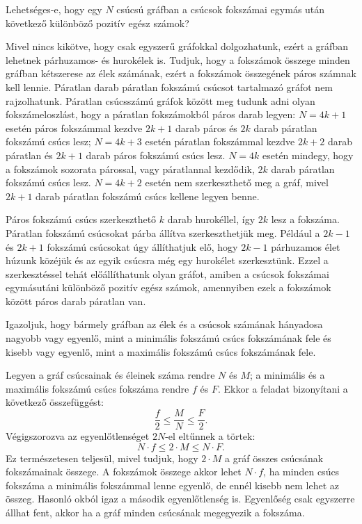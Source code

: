 \begin{problem}
	Lehetséges-e, hogy egy $N$ csúcsú gráfban a csúcsok fokszámai egymás után következő különböző pozitív egész számok?
\end{problem}
\begin{solution}
	Mivel nincs kikötve, hogy csak egyszerű gráfokkal dolgozhatunk, ezért a gráfban lehetnek párhuzamos- és hurokélek is.
	Tudjuk, hogy a fokszámok összege minden gráfban kétszerese az élek számának, ezért a fokszámok összegének páros számnak kell lennie.
	Páratlan darab páratlan fokszámú csúcsot tartalmazó gráfot nem rajzolhatunk.
	Páratlan csúcsszámú gráfok között meg tudunk adni olyan fokszámeloszlást, hogy a páratlan fokszámokból páros darab legyen:
	$N=4k+1$ esetén páros fokszámmal kezdve $2k+1$ darab páros és $2k$ darab páratlan fokszámú csúcs lesz;
	$N=4k+3$ esetén páratlan fokszámmal kezdve $2k+2$ darab páratlan és $2k+1$ darab páros fokszámú csúcs lesz.
	$N=4k$ esetén mindegy, hogy a fokszámok sozorata párossal, vagy páratlannal kezdődik, $2k$ darab páratlan fokszámú csúcs lesz.
	$N=4k+2$ esetén nem szerkeszthető meg a gráf, mivel $2k+1$ darab páratlan fokszámú csúcs kellene legyen benne.
	
	Páros fokszámú csúcs szerkeszthető $k$ darab hurokéllel, így $2k$ lesz a fokszáma.
	Páratlan fokszámú csúcsokat párba állítva szerkeszthetjük meg. Például a $2k-1$ és $2k+1$ fokszámú csúcsokat úgy állíthatjuk elő, hogy $2k-1$ párhuzamos élet húzunk közéjük és az egyik csúcsra még egy hurokélet szerkesztünk.
	Ezzel a szerkesztéssel tehát előállíthatunk olyan gráfot, amiben a csúcsok fokszámai egymásutáni különböző pozitív egész számok, amennyiben ezek a fokszámok között páros darab páratlan van.
\end{solution}
\begin{problem}
	Igazoljuk, hogy bármely gráfban az élek és a csúcsok számának hányadosa nagyobb vagy egyenlő, mint a minimális fokszámú csúcs fokszámának fele és kisebb vagy egyenlő, mint a maximális fokszámú csúcs fokszámának fele.
\end{problem}
\begin{solution}
	Legyen a gráf csúcsainak és éleinek száma rendre $N$ és $M$;
	a minimális és a maximális fokszámú csúcs fokszáma rendre $f$ és $F$.
	Ekkor a feladat bizonyítani a következő összefüggést:
	$$
	\frac{f}{2}\le\frac{M}{N}\le\frac{F}{2}.
	$$
	Végigszorozva az egyenlőtlenséget $2N$-el eltűnnek a törtek:
	$$
	N\cdot f \le 2\cdot M \le N\cdot F.
	$$
	Ez természetesen teljesül, mivel tudjuk, hogy $2\cdot M$ a gráf összes csúcsának fokszámainak összege.
	A fokszámok összege akkor lehet $N\cdot f$, ha minden csúcs fokszáma a minimális fokszámmal lenne egyenlő, de ennél kisebb nem lehet az összeg.
	Hasonló okból igaz a második egyenlőtlenség is.
	Egyenlőség csak egyszerre állhat fent, akkor ha a gráf minden csúcsának megegyezik a fokszáma.
\end{solution}
